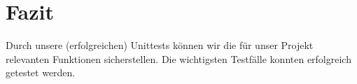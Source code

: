 \chapter{Fazit}
	Durch unsere (erfolgreichen) Unittests können wir die für unser Projekt relevanten Funktionen sicherstellen.
	Die wichtigsten Testfälle konnten erfolgreich getestet werden.
	
	